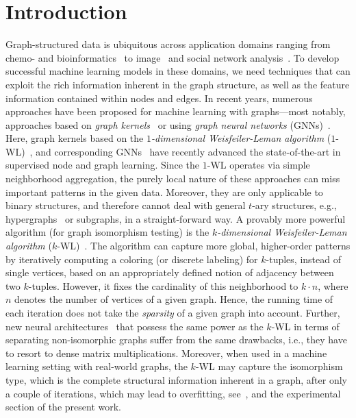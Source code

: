 \documentclass{article}
\theoremstyle{definition}
\newcommand{\new}[1]{\emph{#1}}
\newcommand{\wl}{$1$-\textsf{WL}\xspace}
\newcommand{\kwl}{$k$-\textsf{WL}\xspace}
\begin{document}
\section{Introduction}
Graph-structured data is ubiquitous across application domains ranging from chemo- and bioinformatics~\cite{Barabasi2004,Sto+2020} to image~\cite{Sim+2017} and social network analysis~\cite{Eas+2010}. To develop successful machine learning models in these domains, we need techniques that can exploit the rich information inherent in the graph structure, as well as the feature information contained within nodes and edges. In recent years, numerous approaches have been proposed for machine learning with graphs---most notably, approaches based on \new{graph kernels}~\cite{Kri+2019} or using \new{graph neural networks} (GNNs)~\cite{Cha+2020,Gil+2017,Gro+2020}. Here, graph kernels based on the \new{$1$-dimensional Weisfeiler-Leman algorithm} (\wl)~\cite{Gro2017,Wei+1968}, and corresponding GNNs~\cite{Mor+2019,Xu+2018b} have recently advanced the state-of-the-art in supervised node and graph learning. Since the \wl operates via simple neighborhood aggregation, the purely local nature of these approaches can miss important patterns in the given data. Moreover, they are only applicable to binary structures, and therefore cannot deal with general $t$-ary structures, e.g., hypergraphs~\cite{Zho+2006} or subgraphs, in a straight-forward way. A provably more powerful algorithm (for graph isomorphism testing) is the \emph{$k$-dimensional Weisfeiler-Leman algorithm} (\kwl)~\cite{Cai+1992,Gro2017,Mar+2019}. The algorithm can capture more global, higher-order patterns by iteratively computing a coloring (or discrete labeling) for $k$-tuples, instead of single vertices, based on an appropriately defined notion of adjacency between two $k$-tuples. However, it fixes the cardinality of this neighborhood to $k\cdot n$, where $n$ denotes the number of vertices of a given graph. Hence, the running time of each iteration does not take the \emph{sparsity} of a given graph into account. Further, new neural architectures~\cite{Mar+2019,Mar+2019b} that possess the same power as the \kwl in terms of separating non-isomorphic graphs suffer from the same drawbacks, i.e., they have to resort to dense matrix multiplications. Moreover, when used in a machine learning setting with real-world graphs, the \kwl may capture the isomorphism type, which is the complete structural information inherent in a graph, after only a couple of iterations, which may lead to overfitting, see~\cite{Mor+2017}, and the experimental section of the present work.
\end{document}
